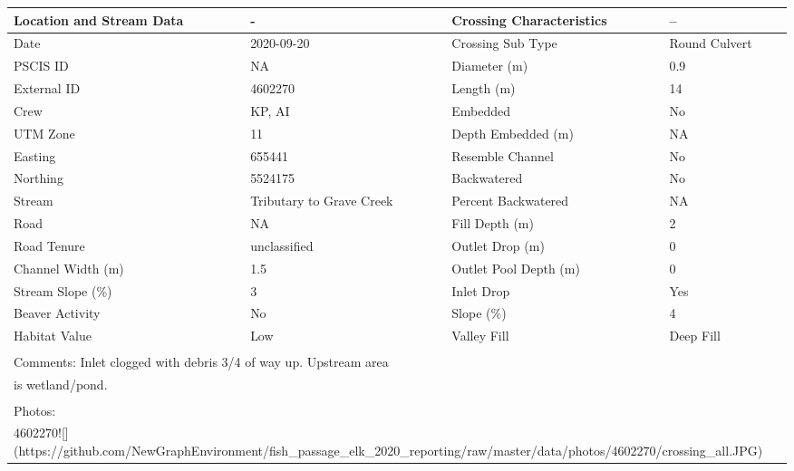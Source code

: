 \documentclass[
]{book}
\begin{document}
\begin{tabular}{l|l|l|l}
\hline
Location and Stream Data & - & Crossing Characteristics & --\\
\hline
Date & 2020-09-20 & Crossing Sub Type & Round Culvert\\
\hline
PSCIS ID & NA & Diameter (m) & 0.9\\
\hline
External ID & 4602270 & Length (m) & 14\\
\hline
Crew & KP, AI & Embedded & No\\
\hline
UTM Zone & 11 & Depth Embedded (m) & NA\\
\hline
Easting & 655441 & Resemble Channel & No\\
\hline
Northing & 5524175 & Backwatered & No\\
\hline
Stream & Tributary to Grave Creek & Percent Backwatered & NA\\
\hline
Road & NA & Fill Depth (m) & 2\\
\hline
Road Tenure & unclassified & Outlet Drop (m) & 0\\
\hline
Channel Width (m) & 1.5 & Outlet Pool Depth (m) & 0\\
\hline
Stream Slope (\%) & 3 & Inlet Drop & Yes\\
\hline
Beaver Activity & No & Slope (\%) & 4\\
\hline
Habitat Value & Low & Valley Fill & Deep Fill\\
\hline
\multicolumn{4}{l}{\textsuperscript{} Comments: Inlet clogged with debris 3/4 of way up. Upstream area}\\
\multicolumn{4}{l}{is wetland/pond.}\\
\multicolumn{4}{l}{\textsuperscript{} Photos:}\\
\multicolumn{4}{l}{4602270![](https://github.com/NewGraphEnvironment/fish\_passage\_elk\_2020\_reporting/raw/master/data/photos/4602270/crossing\_all.JPG)}\\
\end{tabular}
\end{document}
